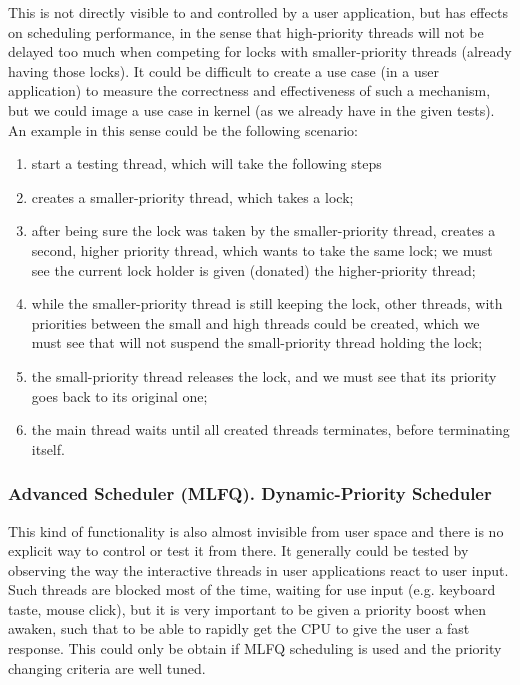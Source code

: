 This is not directly visible to and controlled by a user application, but has effects on scheduling performance, in the sense that high-priority threads will not be delayed too much when competing for locks with smaller-priority threads (already having those locks). It could be difficult to create a use case (in a user application) to measure the correctness and effectiveness of such a mechanism, but we could image a use case in kernel (as we already have in the given tests). An example in this sense could be the following scenario:
\begin{enumerate}
    \item start a testing thread, which will take the following steps
    \item creates a smaller-priority thread, which takes a lock;
    \item after being sure the lock was taken by the smaller-priority thread, creates a second, higher priority thread, which wants to take the same lock; we must see the current lock holder is given (donated) the higher-priority thread;
    \item while the smaller-priority thread is still keeping the lock, other threads, with priorities between the small and high threads could be created, which we must see that will not suspend the small-priority thread holding the lock;
    \item the small-priority thread releases the lock, and we must see that its priority goes back to its original one;
    \item the main thread waits until all created threads terminates, before terminating itself.
\end{enumerate}



\subsubsection{Advanced Scheduler (MLFQ). Dynamic-Priority Scheduler}

This kind of functionality is also almost invisible from user space and there is no explicit way to control or test it from there. It generally could be tested by observing the way the interactive threads in user applications react to user input. Such threads are blocked most of the time, waiting for use input (e.g. keyboard taste, mouse click), but it is very important to be given a priority boost when awaken, such that to be able to rapidly get the CPU to give the user a fast response. This could only be obtain if MLFQ scheduling is used and the priority changing criteria are well tuned. 



